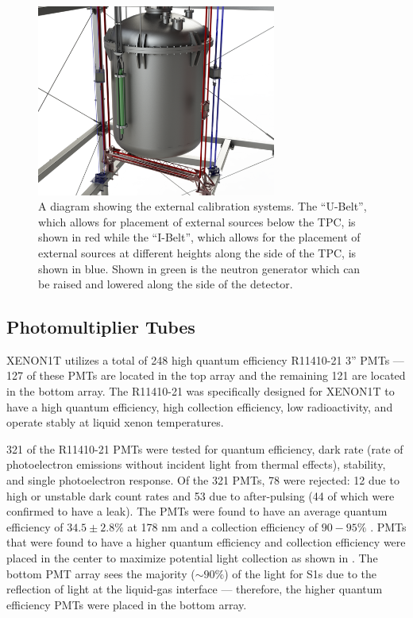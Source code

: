  \begin{figure}[t]
	\centering
	\includegraphics[width=0.7\textwidth]{xe1t_external_sources}
	\caption{A diagram showing the external calibration systems.  The ``U-Belt'', which allows for placement of external sources below the TPC, is shown in red while the ``I-Belt'', which allows for the placement of external sources at different heights along the side of the TPC, is shown in blue.  Shown in green is the neutron generator which can be raised and lowered along the side of the detector.}
	\label{fig:xe1t_external_sources}
\end{figure}
 
 
 \subsection{Photomultiplier Tubes}
 \label{sec:photomultiplier_tubes}
 
XENON1T utilizes a total of 248 high quantum efficiency  R11410-21 3'' PMTs --- 127 of these PMTs are located in the top array and the remaining 121  are located in the bottom array.  The R11410-21 was specifically designed for XENON1T to have a high quantum efficiency, high collection efficiency, low radioactivity, and operate stably at liquid xenon temperatures.  

321 of the R11410-21 PMTs were tested for quantum efficiency, dark rate (rate of photoelectron emissions without incident light from thermal effects), stability, and single photoelectron response.  Of the 321 PMTs, 78 were rejected: 12 due to high or unstable dark count rates and 53 due to after-pulsing (44 of which were confirmed to have a leak).  The PMTs were found to have an average quantum efficiency of $34.5 \pm 2.8 \%$ at 178 nm and a collection efficiency of $90 - 95 \%$ \cite{barrow2017qualification}.  PMTs that were found to have a higher quantum efficiency and collection efficiency were placed in the center to maximize potential light collection as shown in .  The bottom PMT array sees the majority ($\sim 90\%$) of the light for S1s due to the reflection of light at the liquid-gas interface --- therefore, the higher quantum efficiency PMTs were placed in the bottom array.

